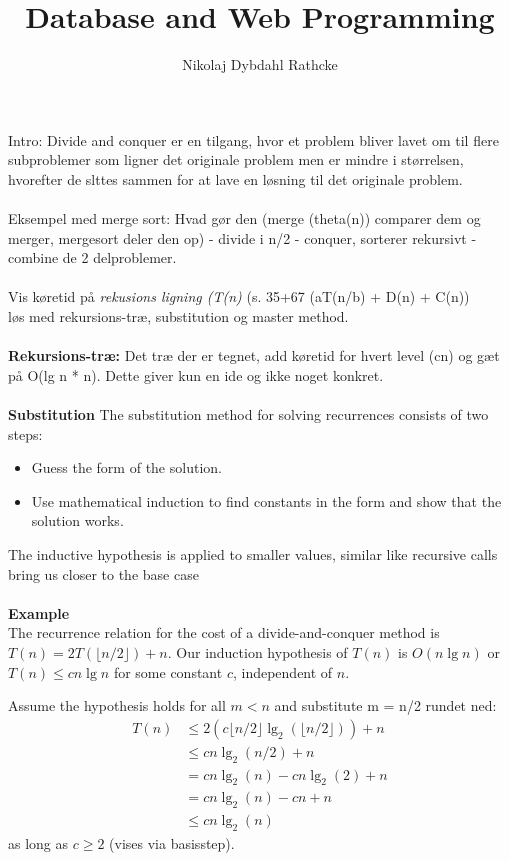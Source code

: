 \documentclass[12pt]{article}
\title{Database and Web Programming}
\author{Nikolaj Dybdahl Rathcke}
\begin{document}
Intro: Divide and conquer er en tilgang, hvor et problem bliver lavet om til flere subproblemer som ligner det originale problem men er mindre i størrelsen, hvorefter de slttes sammen for at lave en løsning til det originale problem.\\
\\
Eksempel med merge sort: Hvad gør den (merge (theta(n)) comparer dem og merger, mergesort deler den op) - divide i n/2 - conquer, sorterer rekursivt - combine de 2 delproblemer.\\
\\
Vis køretid på \textit{rekusions ligning (T(n)} (s. 35+67 (aT(n/b) + D(n) + C(n))\\
løs med rekursions-træ, substitution og master method.\\
\\
\textbf{Rekursions-træ:} Det træ der er tegnet, add køretid for hvert level (cn) og gæt på O(lg n * n). Dette giver kun en ide og ikke noget konkret.\\
\\
\textbf{Substitution}
The substitution method for solving recurrences consists of
two steps:
\begin{itemize}
\item Guess the form of the solution.
\item Use mathematical induction to find constants in the form and show that
the solution works.
\end{itemize}
The inductive hypothesis is applied to smaller values,
similar like recursive calls bring us closer to the base case
\\\\
\noindent \textbf{Example}\\
The recurrence relation for the cost of a divide-and-conquer method is
$T(n) = 2T( \lfloor n/2 \rfloor ) + n$. Our induction hypothesis of $T(n)$ is
$O(n \lg n)$ or $T(n) \leq cn \lg n$ for some constant $c$, independent of $n$.

Assume the hypothesis holds for all $m < n$ and substitute m = n/2 rundet ned:
\begin{align}
	T(n) &\leq 2(c \lfloor n/2 \rfloor \lg_2 (\lfloor n/2 \rfloor )) + n \\
	&\leq cn \lg_2(n/2)+n \\
	&= cn \lg_2(n) - cn \lg_2(2)+n \\
	&= cn \lg_2(n) - cn + n \\
	&\leq cn \lg_2 (n)
\end{align}
as long as $c \geq 2$  (vises via basisstep).
\end{document}

